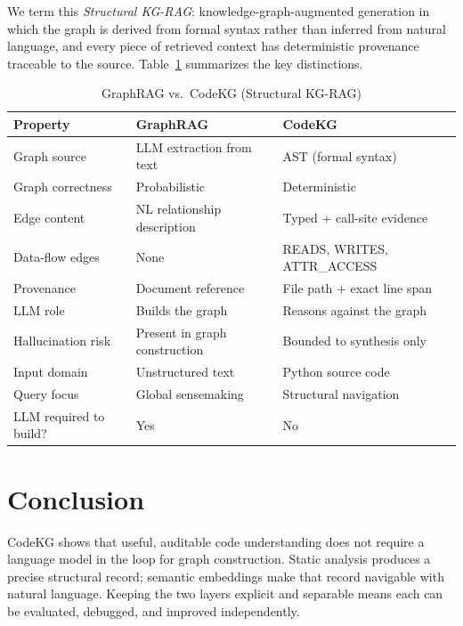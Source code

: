 \documentclass[10pt]{article}
\begin{document}
We term this \emph{Structural KG-RAG}: knowledge-graph-augmented generation in
which the graph is derived from formal syntax rather than inferred from natural
language, and every piece of retrieved context has deterministic provenance
traceable to the source. Table~\ref{tab:comparison} summarizes the key distinctions.

\begin{table}[h]
\centering
\caption{GraphRAG vs.\ CodeKG (Structural KG-RAG)}
\label{tab:comparison}
\begin{tabular}{lll}
\toprule
Property & GraphRAG~\cite{edge2024graphrag} & CodeKG \\
\midrule
Graph source        & LLM extraction from text     & AST (formal syntax)         \\
Graph correctness   & Probabilistic                & Deterministic                \\
Edge content        & NL relationship description  & Typed + call-site evidence   \\
Data-flow edges     & None                         & READS, WRITES, ATTR\_ACCESS  \\
Provenance          & Document reference           & File path + exact line span  \\
LLM role            & Builds the graph             & Reasons against the graph    \\
Hallucination risk  & Present in graph construction & Bounded to synthesis only   \\
Input domain        & Unstructured text            & Python source code           \\
Query focus         & Global sensemaking           & Structural navigation        \\
LLM required to build? & Yes                      & No                          \\
\bottomrule
\end{tabular}
\end{table}

\section{Conclusion}

CodeKG shows that useful, auditable code understanding does not require a language
model in the loop for graph construction. Static analysis produces a precise
structural record; semantic embeddings make that record navigable with natural
language. Keeping the two layers explicit and separable means each can be evaluated,
debugged, and improved independently.
\end{document}
